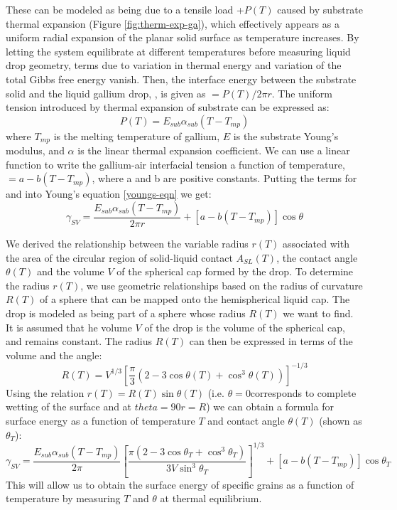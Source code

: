 These can be modeled as being due to a tensile load +$P(T)$ caused by substrate thermal expansion (Figure \ref{fig:therm-exp-ga}), which effectively appears as a uniform radial expansion of the planar solid surface as temperature increases. By letting the system equilibrate at different temperatures before measuring liquid drop geometry, terms due to variation in thermal energy and variation of the total Gibbs free energy vanish. Then, the interface energy between the substrate solid and the liquid gallium drop, \gamSL, is given as \gamSL$=P(T)/2\pi r$. The uniform tension introduced by thermal expansion of substrate can be expressed as:
\begin{equation}\label{uniform-tension}
	P(T) = E_{sub}\alpha_{sub}(T-T_{mp})
\end{equation}
where $T_{mp}$ is the melting temperature of gallium, $E$  is the substrate Young’s modulus, and $\alpha$ is the linear thermal expansion coefficient. We can use a linear function to write the gallium-air interfacial tension a function of temperature, \gamLV $= a-b(T-T_{mp})$, where a and b are positive constants.\cite{Hardy1985,Alchagirov2005} Putting the terms for \gamSL and \gamSV into Young’s equation \ref{youngs-eqn} we get\cite{Rudawska2009,Tadmor2004}:
\begin{equation*}%
	\gamma_{SV} =  \frac{E_{sub}\alpha_{sub}(T-T_{mp})}{2\pi r} + \left[a-b(T-T_{mp})\right]\cos\theta
\end{equation*}

We derived the relationship between the variable radius $r(T)$ associated with the area of the circular region of solid-liquid contact $A_{SL}(T)$, the contact angle $\theta(T)$ and the volume $V$ of the spherical cap formed by the drop. To determine the radius $r(T)$, we use geometric relationships based on the radius of curvature $R(T)$ of a sphere  that can be mapped onto the hemispherical liquid cap. The drop is modeled as being part of a sphere whose radius $R(T)$ we want to find. It is assumed that he volume $V$ of the drop is the volume of the spherical cap, and remains constant. The radius $R(T)$ can then be expressed in terms of the volume and the angle:
\begin{equation*}\label{drop-geom}
	R(T) = V^{1/3} \left[\frac{\pi}{3} \left(2-3\cos\theta(T)+\cos^{3}\theta(T)\right)\right]^{-1/3}
\end{equation*}
Using the relation $r(T)=R(T)\sin\theta(T)$ (i.e. $\theta=$0\degree corresponds to complete wetting of the surface and at $
theta=90$\degree $r=R$) we can obtain a formula for surface energy as a function of temperature $T$ and contact angle $\theta(T)$ (shown as $\theta_{T}$):
\begin{equation}\label{youngs-eqn-ga}
	\gamma_{SV} =  \frac{E_{sub}\alpha_{sub}(T-T_{mp})}{2\pi}\left[\frac{\pi\left(2-3\cos\theta_{T}+\cos^{3}\theta_{T}\right)}{3V\sin^{3}\theta_{T}} \right]^{1/3} + \left[a-b(T-T_{mp})\right]\cos\theta_{T}
\end{equation}
This will allow us to obtain the surface energy \gamSV of specific grains as a function of temperature by measuring $T$ and $\theta$ at thermal equilibrium.

